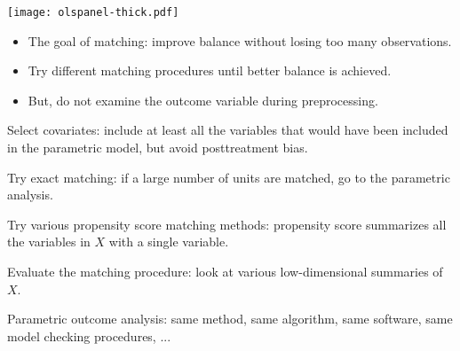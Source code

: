 \documentclass[20pt,landscape,pdftex]{foils}
\begin{document}
\texttt{[image: olspanel-thick.pdf]}\pause



\hypersetup{pdfpagetransition=Replace}

\begin{itemize}
\item The goal of matching: improve balance without losing too many
  observations.\pause

\item Try different matching procedures until better balance is
  achieved.\pause

\item But, do not examine the outcome variable during
  preprocessing.\pause

\end{itemize}

 Select covariates: include at least all the
variables that would have been included in the parametric model, but
avoid posttreatment bias.\pause
  
 Try exact matching: if a large number of units
are matched, go to the parametric analysis.\pause
  
 Try various propensity score matching methods:
propensity score summarizes all the variables in $X$ with a single
variable.\pause
  
 Evaluate the matching procedure: look at various
low-dimensional summaries of $X$.\pause
  
 Parametric outcome analysis: same method, same
algorithm, same software, same model checking procedures, ...\pause



\hypersetup{pdfpagetransition=Replace}
\end{document}

